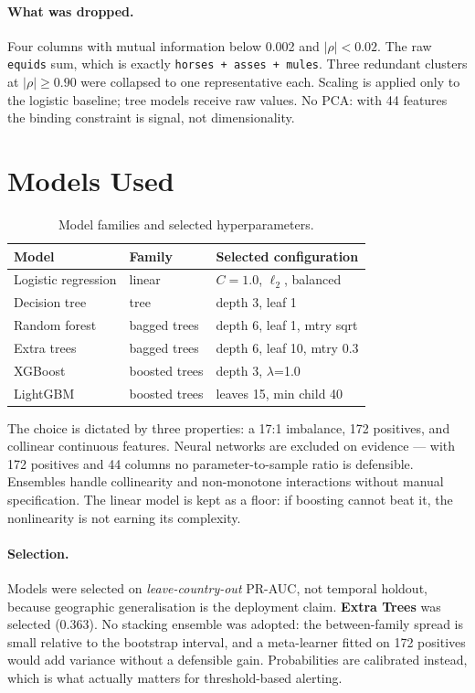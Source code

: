 \documentclass[11pt]{article}
\begin{document}
\paragraph{What was dropped.} Four columns with mutual information below 0.002 and
$|\rho|<0.02$. The raw \texttt{equids} sum, which is exactly \texttt{horses + asses + mules}.
Three redundant clusters at $|\rho|\geq0.90$ were collapsed to one representative each. Scaling is
applied only to the logistic baseline; tree models receive raw values. No PCA: with 44 features the
binding constraint is signal, not dimensionality.

\section{Models Used}

\begin{table}[H]
\centering
\caption{Model families and selected hyperparameters.}
\small
\begin{tabular}{@{}>{\raggedright\arraybackslash}p{3.4cm}>{\raggedright\arraybackslash}p{3.1cm}>{\raggedright\arraybackslash}p{8.2cm}@{}}
\toprule
\textbf{Model} & \textbf{Family} & \textbf{Selected configuration} \\
\midrule
Logistic regression & linear & $C=1.0$, $\ell_2$, balanced \\
Decision tree & tree & depth 3, leaf 1 \\
Random forest & bagged trees & depth 6, leaf 1, mtry sqrt \\
Extra trees & bagged trees & depth 6, leaf 10, mtry 0.3 \\
XGBoost & boosted trees & depth 3, $\lambda$=1.0 \\
LightGBM & boosted trees & leaves 15, min child 40 \\
\bottomrule
\end{tabular}
\end{table}

\noindent
The choice is dictated by three properties: a 17:1 imbalance,
172 positives, and collinear continuous features. Neural networks are excluded on
evidence --- with 172 positives and 44 columns no parameter-to-sample ratio is
defensible. Ensembles handle collinearity and non-monotone interactions without manual
specification. The linear model is kept as a floor: if boosting cannot beat it, the nonlinearity is
not earning its complexity.

\paragraph{Selection.} Models were selected on \emph{leave-country-out} PR-AUC, not temporal
holdout, because geographic generalisation is the deployment claim. \textbf{Extra Trees} was
selected (0.363). No stacking ensemble was adopted: the between-family spread is small
relative to the bootstrap interval, and a meta-learner fitted on 172 positives would
add variance without a defensible gain. Probabilities are calibrated instead, which is what actually
matters for threshold-based alerting.
\end{document}
